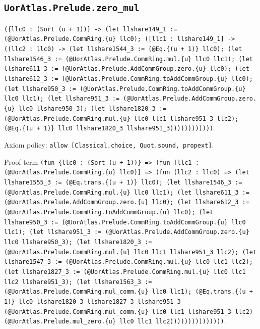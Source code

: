 \documentclass[11pt]{article}
\begin{document}
\subsection*{\texttt{UorAtlas.Prelude.zero\_mul}}
\noindent\texttt{(\{llc0 : (Sort (u + 1))\} -> (let llshare149\_1 := (@UorAtlas.Prelude.CommRing.\{u\} llc0); ([llc1 : llshare149\_1] -> ((llc2 : llc0) -> (let llshare1544\_3 := (@Eq.\{(u + 1)\} llc0); (let llshare1546\_3 := (@UorAtlas.Prelude.CommRing.mul.\{u\} llc0 llc1); (let llshare611\_3 := (@UorAtlas.Prelude.AddCommGroup.zero.\{u\} llc0); (let llshare612\_3 := (@UorAtlas.Prelude.CommRing.toAddCommGroup.\{u\} llc0); (let llshare950\_3 := (@UorAtlas.Prelude.CommRing.toAddCommGroup.\{u\} llc0 llc1); (let llshare951\_3 := (@UorAtlas.Prelude.AddCommGroup.zero.\{u\} llc0 llshare950\_3); (let llshare1820\_3 := (@UorAtlas.Prelude.CommRing.mul.\{u\} llc0 llc1 llshare951\_3 llc2); (@Eq.\{(u + 1)\} llc0 llshare1820\_3 llshare951\_3))))))))))))}\par
\noindent Axiom policy: \texttt{allow [Classical.choice, Quot.sound, propext]}.\par
\noindent Proof term \texttt{(fun \{llc0 : (Sort (u + 1))\} => (fun [llc1 : (@UorAtlas.Prelude.CommRing.\{u\} llc0)] => (fun (llc2 : llc0) => (let llshare1555\_3 := (@Eq.trans.\{(u + 1)\} llc0); (let llshare1546\_3 := (@UorAtlas.Prelude.CommRing.mul.\{u\} llc0 llc1); (let llshare611\_3 := (@UorAtlas.Prelude.AddCommGroup.zero.\{u\} llc0); (let llshare612\_3 := (@UorAtlas.Prelude.CommRing.toAddCommGroup.\{u\} llc0); (let llshare950\_3 := (@UorAtlas.Prelude.CommRing.toAddCommGroup.\{u\} llc0 llc1); (let llshare951\_3 := (@UorAtlas.Prelude.AddCommGroup.zero.\{u\} llc0 llshare950\_3); (let llshare1820\_3 := (@UorAtlas.Prelude.CommRing.mul.\{u\} llc0 llc1 llshare951\_3 llc2); (let llshare1547\_3 := (@UorAtlas.Prelude.CommRing.mul.\{u\} llc0 llc1 llc2); (let llshare1827\_3 := (@UorAtlas.Prelude.CommRing.mul.\{u\} llc0 llc1 llc2 llshare951\_3); (let llshare1563\_3 := (@UorAtlas.Prelude.CommRing.mul\_comm.\{u\} llc0 llc1); (@Eq.trans.\{(u + 1)\} llc0 llshare1820\_3 llshare1827\_3 llshare951\_3 (@UorAtlas.Prelude.CommRing.mul\_comm.\{u\} llc0 llc1 llshare951\_3 llc2) (@UorAtlas.Prelude.mul\_zero.\{u\} llc0 llc1 llc2)))))))))))))))}.\par
\end{document}
